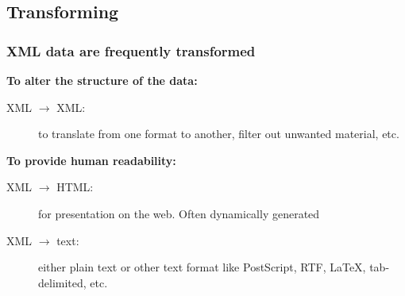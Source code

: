 \usebackgroundtemplate{}




\subsection*{Transforming}




\frame
{
	\frametitle{XML data are frequently transformed}
	
	\textbf{To alter the structure of the data:}

	\begin{description}
	
		\item[XML \(\rightarrow\) XML:] to translate from one format to
		another, filter out unwanted material, etc.
		
	\end{description}

	\textbf{To provide human readability:}
	
	\begin{description}
	
		\item[XML \(\rightarrow\) HTML:] for presentation on the web.
		Often dynamically generated
		
		\item[XML \(\rightarrow\) text:] either plain text or other text
		format like PostScript, RTF, \LaTeX, tab-delimited, etc.
	
	\end{description}
	
}




